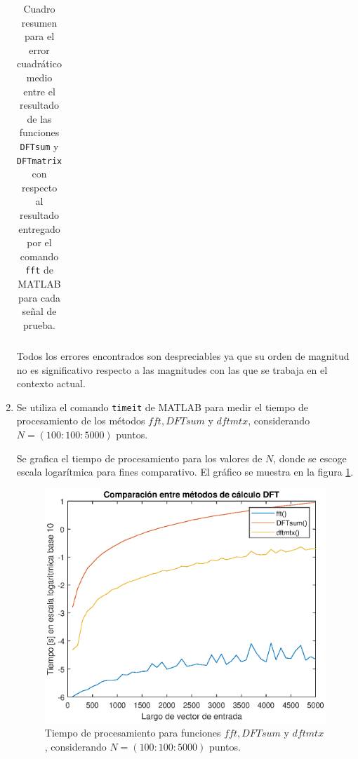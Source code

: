 \begin{enumerate}
\begin{table}[H]
\begin{tabular}{|c|c|c|}
        \end{tabular}
        \caption{Cuadro resumen para el error cuadrático medio entre el resultado de las funciones \texttt{DFTsum} y  \texttt{DFTmatrix} con respecto al resultado entregado por el comando \texttt{fft} de MATLAB para cada señal de prueba.}
        \label{MSE}
    \end{table}
    
    Todos los errores encontrados son despreciables ya que su orden de magnitud no es significativo respecto a las magnitudes con las que se trabaja en el contexto actual.
    

    \item Se utiliza el comando \texttt{timeit} de MATLAB para medir el tiempo de procesamiento de los métodos $fft, DFTsum$ y $dftmtx$, considerando $N = (100:100:5000)$ puntos.   
    
    Se grafica el tiempo de procesamiento para los valores de $N$, donde se escoge escala logarítmica para fines comparativo. El gráfico se muestra en la figura \ref{fig:p5_4cmp}. 
    
    \begin{figure}[H]
        \centering
        \includegraphics[width = .8\linewidth]{Figuras/p5_4cmp.eps}
        \caption{Tiempo de procesamiento para funciones $fft, DFTsum$ y $dftmtx$, considerando $N = (100:100:5000)$ puntos.}
        \label{fig:p5_4cmp}
    \end{figure}
    

\end{enumerate}
